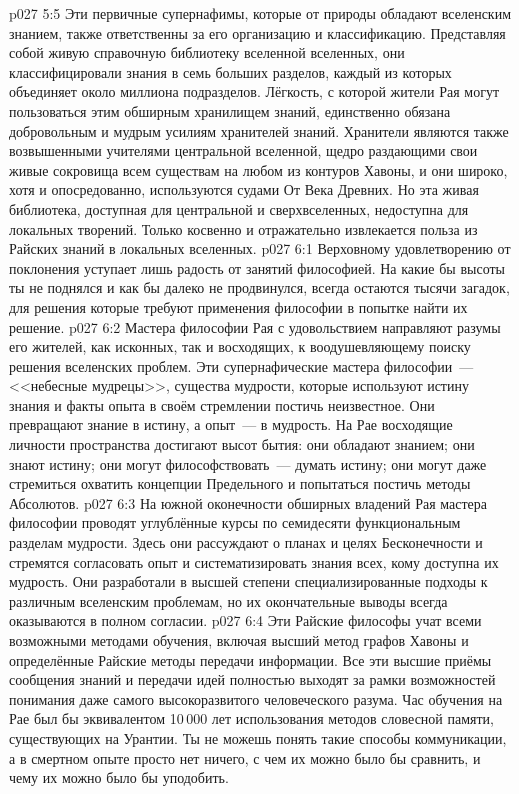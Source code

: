 \vs p027 5:5 Эти первичные супернафимы, которые от природы обладают вселенским знанием, также ответственны за его организацию и классификацию. Представляя собой живую справочную библиотеку вселенной вселенных, они классифицировали знания в семь больших разделов, каждый из которых объединяет около миллиона подразделов. Лёгкость, с которой жители Рая могут пользоваться этим обширным хранилищем знаний, единственно обязана добровольным и мудрым усилиям хранителей знаний. Хранители являются также возвышенными учителями центральной вселенной, щедро раздающими свои живые сокровища всем существам на любом из контуров Хавоны, и они широко, хотя и опосредованно, используются судами От Века Древних. Но эта живая библиотека, доступная для центральной и сверхвселенных, недоступна для локальных творений. Только косвенно и отражательно извлекается польза из Райских знаний в локальных вселенных.
\vs p027 6:1 Верховному удовлетворению от поклонения уступает лишь радость от занятий философией. На какие бы высоты ты не поднялся и как бы далеко не продвинулся, всегда остаются тысячи загадок, для решения которые требуют применения философии в попытке найти их решение.
\vs p027 6:2 Мастера философии Рая с удовольствием направляют разумы его жителей, как исконных, так и восходящих, к воодушевляющему поиску решения вселенских проблем. Эти супернафические мастера философии~--- <<небесные мудрецы>>, существа мудрости, которые используют истину знания и факты опыта в своём стремлении постичь неизвестное. Они превращают знание в истину, а опыт~--- в мудрость. На Рае восходящие личности пространства достигают высот бытия: они обладают знанием; они знают истину; они могут философствовать~--- думать истину; они могут даже стремиться охватить концепции Предельного и попытаться постичь методы Абсолютов.
\vs p027 6:3 На южной оконечности обширных владений Рая мастера философии проводят углублённые курсы по семидесяти функциональным разделам мудрости. Здесь они рассуждают о планах и целях Бесконечности и стремятся согласовать опыт и систематизировать знания всех, кому доступна их мудрость. Они разработали в высшей степени специализированные подходы к различным вселенским проблемам, но их окончательные выводы всегда оказываются в полном согласии.
\vs p027 6:4 Эти Райские философы учат всеми возможными методами обучения, включая высший метод графов Хавоны и определённые Райские методы передачи информации. Все эти высшие приёмы сообщения знаний и передачи идей полностью выходят за рамки возможностей понимания даже самого высокоразвитого человеческого разума. Час обучения на Рае был бы эквивалентом 10\,000 лет использования методов словесной памяти, существующих на Урантии. Ты не можешь понять такие способы коммуникации, а в смертном опыте просто нет ничего, с чем их можно было бы сравнить, и чему их можно было бы уподобить.
